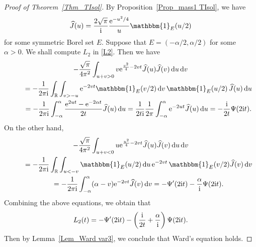 \documentclass[pdftex]{sigma}
\numberwithin{equation}{section}
\newcommand{\R}{{\mathbb R}}
\newcommand{\1}{\chi}
\def\wh{\widehat}
\begin{document}
\begin{proof}[Proof of Theorem~\ref{Thm_TIsol}]
	By Proposition~\ref{Prop_mass1 TIsol}, we have
	\begin{gather*}
		\wh{J}(u)=\frac{2\sqrt{\pi}}{{\rm i}} \frac{{\rm e}^{-u^2/4}}{u} \mathbbm{1}_{E}(u/2)
	\end{gather*}
	for some symmetric Borel set $E$. Suppose that $E=(-\alpha/2,\alpha/2)$ for some $\alpha>0.$ We shall compute $L_2$ in \eqref{L2}.
	Then we have
	\begin{gather*}
 -\frac{\sqrt{\pi}}{4\pi^2} \int_{ u+v>0 } v {\rm e}^{ \frac{v^2}{4}-2vt } \wh{J}(u) \wh{J}(v) \,{\rm d}u\,{\rm d}v
		\\
\qquad{} = - \frac{1}{2\pi {\rm i}} \int_\R \int_{ v>-u } {\rm e}^{-2vt } \mathbbm{1}_{E}(v/2) \,{\rm d}v \, \mathbbm{1}_{E}(u/2)\, \wh{J}(u)\,{\rm d}u
		\\
\qquad{} = - \frac{1}{2\pi {\rm i}} \int_{-\alpha}^{\alpha} \frac{{\rm e}^{2ut}-{\rm e}^{-2\alpha t} }{ 2t } \wh{J}(u)\,{\rm d}u=\frac{1}{2t {\rm i}}\frac{1}{2\pi } \int_{-\alpha}^{\alpha} {\rm e}^{-2ut} \wh{J}(u)\,{\rm d}u=-\frac{{\rm i}}{2t} \Psi(2{\rm i}t).
	\end{gather*}
	On the other hand,
	\begin{gather*}
 -\frac{\sqrt{\pi}}{4\pi^2} \int_{ u+v<0 } u {\rm e}^{ \frac{u^2}{4}-2vt } \wh{J}(u) \wh{J}(v) \,{\rm d}u\,{\rm d}v\\
 \qquad{} =-\frac{1}{2\pi {\rm i}}\int_\R \int_{u<-v} \mathbbm{1}_{E}(u/2)\,{\rm d}u \, {\rm e}^{-2vt}\, \mathbbm{1}_{E}(v/2) \wh{J}(v) \,{\rm d}v
		\\
\qquad {}=-\frac{1}{2\pi {\rm i}} \int_{-\alpha}^\alpha (\alpha-v) {\rm e}^{-2vt} \wh{J}(v) \,{\rm d}v=- \Psi'(2{\rm i}t)-\frac{\alpha}{{\rm i}} \Psi(2{\rm i}t).
	\end{gather*}
	Combining the above equations, we obtain that
	\begin{gather*}
		L_2(t)=-\Psi'(2{\rm i}t)-\left( \frac{{\rm i}}{2t}+\frac{\alpha}{{\rm i}} \right)\Psi(2{\rm i}t).
	\end{gather*}
	Then by Lemma~\ref{Lem_Ward var3}, we conclude that Ward's equation holds.
	

\end{proof}
\end{document}
